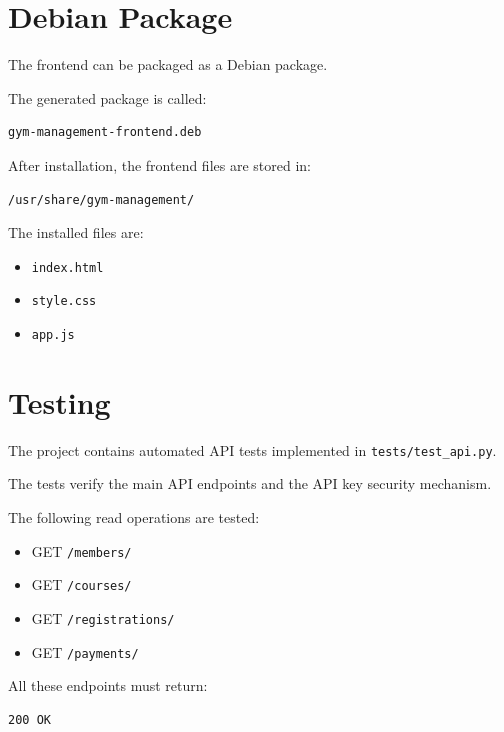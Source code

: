\documentclass[12pt,a4paper]{article}
\begin{document}
\section{Debian Package}

The frontend can be packaged as a Debian package.

The generated package is called:

\begin{lstlisting}
gym-management-frontend.deb
\end{lstlisting}

After installation, the frontend files are stored in:

\begin{lstlisting}
/usr/share/gym-management/
\end{lstlisting}

The installed files are:

\begin{itemize}
    \item \texttt{index.html}
    \item \texttt{style.css}
    \item \texttt{app.js}
\end{itemize}



\section{Testing}

The project contains automated API tests implemented in
\texttt{tests/test\_api.py}.

The tests verify the main API endpoints and the API key security
mechanism.

The following read operations are tested:

\begin{itemize}
    \item GET \texttt{/members/}
    \item GET \texttt{/courses/}
    \item GET \texttt{/registrations/}
    \item GET \texttt{/payments/}
\end{itemize}

All these endpoints must return:

\begin{lstlisting}
200 OK
\end{lstlisting}
\end{document}
